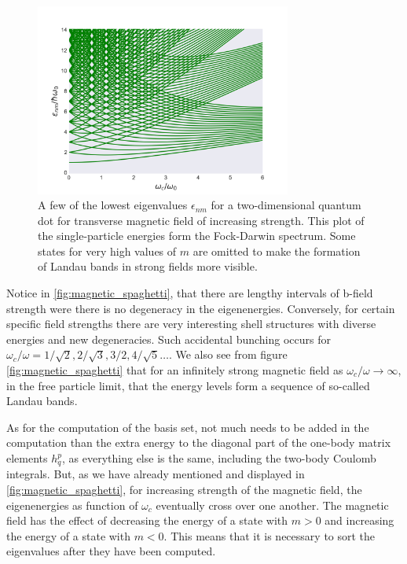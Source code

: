 \begin{figure}
    \centering
    \includegraphics[width=0.75\textwidth]{implementation/figures/spaghetti.png}
    \caption{A few of the lowest eigenvalues $\epsilon_{nm}$ for a two-dimensional 
    quantum dot for transverse magnetic field of increasing strength. This plot of 
    the single-particle energies form the Fock-Darwin spectrum. Some states for very 
    high values of $m$ are omitted to make the formation of Landau bands in strong
    fields more visible.
    \label{fig:magnetic_spaghetti}}
\end{figure}

Notice in \autoref{fig:magnetic_spaghetti}, that there are lengthy intervals of 
b-field strength were there is no degeneracy in the eigenenergies. Conversely, 
for certain specific field strengths there are very interesting shell structures with 
diverse energies and new degeneracies. Such accidental bunching occurs 
for $\omega_c/\omega=1/\sqrt{2}, 2/\sqrt{3}, 3/2, 4/\sqrt{5}\dots$.
We also see from figure 
\autoref{fig:magnetic_spaghetti} that for an infinitely strong magnetic field as 
$\omega_c/\omega \to \infty$, in the free particle limit, that the energy levels 
form a sequence of so-called Landau bands. 


As for the computation of the basis set, not much needs to be added in the computation 
than the extra energy to the diagonal part of the one-body matrix elements $h^p_q$, as 
everything else is the same, including the two-body Coulomb integrals. But, as we have 
already mentioned and displayed in \autoref{fig:magnetic_spaghetti}, for increasing 
strength of the magnetic field, the eigenenergies as function  of $\omega_c$ eventually 
cross over one another. The magnetic field has the effect of decreasing the energy of
a state with $m>0$ and increasing the energy of a state with $m<0$. This means that 
it is necessary to sort the eigenvalues after they have been computed. 

